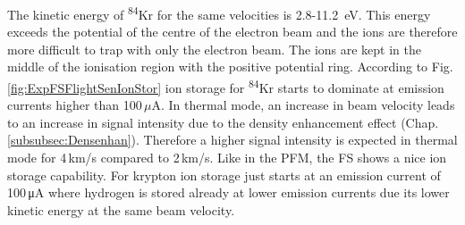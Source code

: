 		The kinetic energy of \textsuperscript{84}Kr for the same velocities is 2.8-11.2~eV. This energy exceeds the potential of the centre of the electron beam and the ions are therefore more difficult to trap with only the electron beam. The ions are kept in the middle of the ionisation region with the positive potential ring. According to Fig.\,\ref{fig:ExpFSFlightSenIonStor} ion storage for \textsuperscript{84}Kr starts to dominate at emission currents higher than 100\,$\mu$A. In thermal mode, an increase in beam velocity leads to an increase in signal intensity due to the density enhancement effect (Chap.\,\ref{subsubsec:Densenhan}). Therefore a higher signal intensity is expected in thermal mode for 4\,km/s compared to 2\,km/s. Like in the PFM, the FS shows a nice ion storage capability. For krypton ion storage just starts at an emission current of 100\,\si{\micro\ampere} where hydrogen is stored already at lower emission currents due its lower kinetic energy at the same beam velocity.\\
